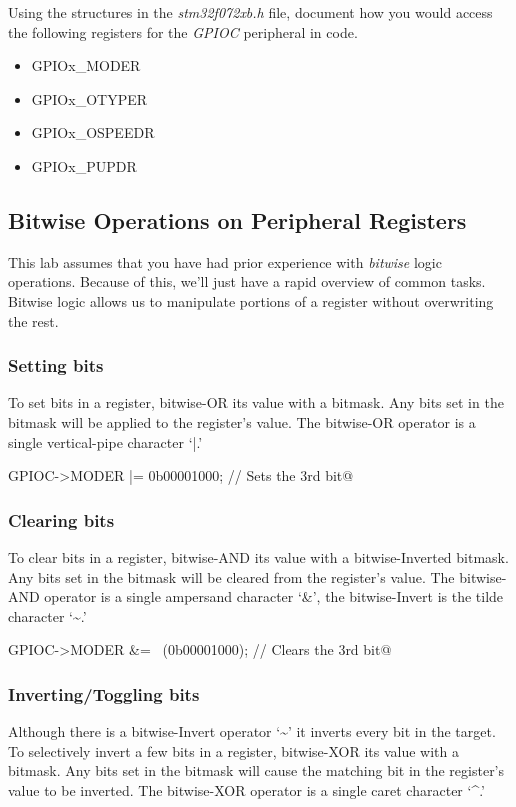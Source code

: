 \documentclass[11pt,fleqn]{book} %
\makeatletter
\newcommand{\ilcode}[1]{
    \smallskip
    \colorbox{gray!20!white}{
        \centering
        \parbox{\linewidth-2\fboxsep}{
            \lstinline@#1@
        }
    }
}
\makeatother
\begin{document}
\begin{exercise}
    \label{ex2}
    Using the structures in the \textit{stm32f072xb.h} file, document how you would access the following registers for the \textit{GPIOC} peripheral in code.
\begin{itemize}
    \item GPIOx\_MODER
    \item GPIOx\_OTYPER
    \item GPIOx\_OSPEEDR
    \item GPIOx\_PUPDR
\end{itemize}
\end{exercise}

\subsection{Bitwise Operations on Peripheral Registers}

This lab assumes that you have had prior experience with \textit{bitwise} logic operations. Because of this, we'll just have a rapid overview of common tasks. Bitwise logic allows us to manipulate portions of a register without overwriting the rest.

\subsubsection{Setting bits}
To set bits in a register, bitwise-OR its value with a bitmask. Any bits set in the bitmask will be applied to the register's value. The bitwise-OR operator is a single vertical-pipe character `|.'

\ilcode{GPIOC->MODER |= 0b00001000;    // Sets the 3rd bit}%

\subsubsection{Clearing bits}
To clear bits in a register, bitwise-AND its value with a bitwise-Inverted bitmask. Any bits set in the bitmask will be cleared from the register's value. The bitwise-AND operator is a single ampersand character `\&', the bitwise-Invert is the tilde character `\textasciitilde.'

\ilcode{GPIOC->MODER \&= ~(0b00001000);    // Clears the 3rd bit}%

\subsubsection{Inverting/Toggling bits}
Although there is a bitwise-Invert operator `\textasciitilde' it inverts every bit in the target. To selectively invert a few bits in a register, bitwise-XOR its value with a bitmask. Any bits set in the bitmask will cause the matching bit in the register's value to be inverted. The bitwise-XOR operator is a single caret character `\textasciicircum.'
\end{document}
